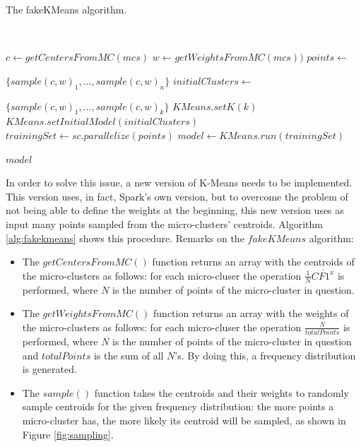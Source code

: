 \begin{algorithm}[h]
 \caption{The fakeKMeans algorithm.}\label{alg:fakekmeans}
 \begin{algorithmic}[1]
 
   \
  
   
  \vspace{10pt}
  
  \State $c \gets getCentersFromMC(mcs)$
  \State $w \gets getWeightsFromMC(mcs))$
  \State $points \gets $
  \item[] $\{sample(c,w)_1,... , sample(c,w)_{n}\}$
  \State $initialClusters \gets$ 
  \item[] $ \{sample(c,w)_1,... , sample(c,w)_k\}$
  \State $KMeans.setK(k)$
  \State $KMeans.setInitialModel(initialClusters)$
  \State $trainingSet \gets sc.parallelize(points)$
  \State $model \gets KMeans.run(trainingSet)$
  
  \Return $model$
 \end{algorithmic}
\end{algorithm}

In order to solve this issue, a new version of K-Means needs to be implemented. This version uses, in fact, Spark's own version, but to overcome the problem of not being able to define the weights at the beginning, this new version uses as input many points sampled from the micro-clusters' centroids. Algorithm \ref{alg:fakekmeans} shows this procedure.
Remarks on the $fakeKMeans$ algorithm:

\begin{itemize}
 \item The $getCentersFromMC()$ function returns an array with the centroids of the micro-clusters as follows: for each micro-cluser the operation $\frac{1}{N}\overline{CF1^x}$ is performed, where $N$ is the number of points of the micro-cluster in question.
 \item The $getWeightsFromMC()$ function returns an array with the weights of the micro-clusters as follows: for each micro-cluser the operation $\frac{N}{totalPoints}$ is performed, where $N$ is the number of points of the micro-cluster in question and $totalPoints$ is the sum of all $N$'s. By doing this, a frequency distribution is generated.
 \item The $sample()$ function takes the centroids and their weights to randomly sample centroids for the given frequency distribution: the more points a micro-cluster has, the more likely its centroid will be sampled, as shown in Figure \ref{fig:sampling}.
\end{itemize}

